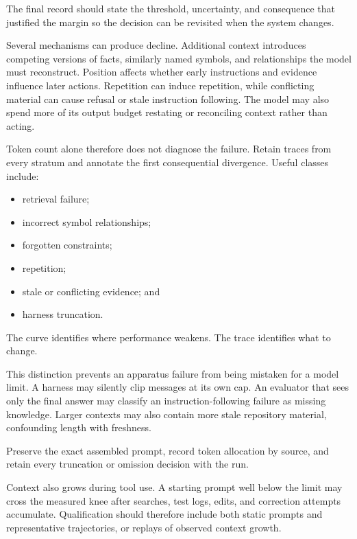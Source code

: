 The final record should state the threshold, uncertainty, and consequence that justified the margin so the decision can be revisited when the system changes.

Several mechanisms can produce decline. Additional context introduces competing versions of facts, similarly named symbols, and relationships the model must reconstruct. Position affects whether early instructions and evidence influence later actions. Repetition can induce repetition, while conflicting material can cause refusal or stale instruction following. The model may also spend more of its output budget restating or reconciling context rather than acting.


Token count alone therefore does not diagnose the failure. Retain traces from every stratum and annotate the first consequential divergence. Useful classes include:

\begin{itemize}
\tightlist
\item
  retrieval failure;
\item
  incorrect symbol relationships;
\item
  forgotten constraints;
\item
  repetition;
\item
  stale or conflicting evidence; and
\item
  harness truncation.
\end{itemize}

The curve identifies where performance weakens. The trace identifies what to change.

This distinction prevents an apparatus failure from being mistaken for a model limit. A harness may silently clip messages at its own cap. An evaluator that sees only the final answer may classify an instruction-following failure as missing knowledge. Larger contexts may also contain more stale repository material, confounding length with freshness.

Preserve the exact assembled prompt, record token allocation by source, and retain every truncation or omission decision with the run.

Context also grows during tool use. A starting prompt well below the limit may cross the measured knee after searches, test logs, edits, and correction attempts accumulate. Qualification should therefore include both static prompts and representative trajectories, or replays of observed context growth.

